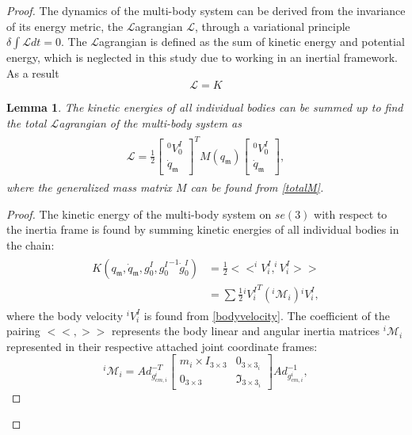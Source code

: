 \documentclass[lettersize,journal]{IEEEtran}
\def \L {\mathcal{L}}
\newtheorem{lemma}[theorem]{Lemma}
\begin{document}
\begin{proof}[Proof]
The dynamics of the multi-body system can be derived from the invariance of its energy metric, the $\mathcal{L}$agrangian $\mathcal{L}$, through a variational principle $\delta \int \mathcal{L}dt=0$. The $\L$agrangian is defined as the sum of kinetic energy and potential energy, which is neglected in this study due to working in an inertial framework. As a result
\begin{equation}
    \mathcal{L}=K
\end{equation}
\begin{lemma}
The kinetic energies of all individual bodies can be summed up to find the total $\L$agrangian of the multi-body system as
\begin{align}
\begin{split}
    \L=\frac{1}{2}\begin{bmatrix}^0V^I_0 \\ \dot{q}_\mathfrak{m}\end{bmatrix}^T M(q_\mathfrak{m}) \begin{bmatrix}^0V^I_0\\\dot{q}_\mathfrak{m}\end{bmatrix},
\end{split}
\label{kinenergy}
\end{align}
where the generalized mass matrix $M$ can be found from \eqref{totalM}.
\end{lemma} 
\begin{proof}[Proof] The kinetic energy of the multi-body system on $se(3)$ with respect to the inertia frame is found by summing kinetic energies of all individual bodies in the chain:
\begin{align}
\begin{split}
    K(q_\mathfrak{m},\dot{q}_\mathfrak{m},{g_0^I},{g^I_0}^{-1}\dot{g}^I_0)&=\frac{1}{2}<<^iV^I_i,^iV^I_i>>\\
    &=\sum \frac{1}{2} {{}^iV_i^I}^T(^i\mathcal{M}_i){}^iV_i^I,    
\end{split}
\end{align}
where the body velocity ${}^iV_i^I$ is found from \eqref{bodyvelocity}. The coefficient of the pairing $<< , >>$ represents the body linear and angular inertia matrices $^i\mathcal{M}_i$ represented in their respective attached joint coordinate frames: %
\begin{equation}
    ^i\mathcal{M}_i=Ad_{g^i_{cm,i}}^{-T}\begin{bmatrix}m_i\times I_{3\times3} & 0_{3\times3_i}\\0_{3\times3} & \mathfrak{I}_{3\times3_i}\end{bmatrix}Ad_{g^i_{cm,i}}^{-1},

\end{equation}
\end{proof}
\end{proof}
\end{document}
